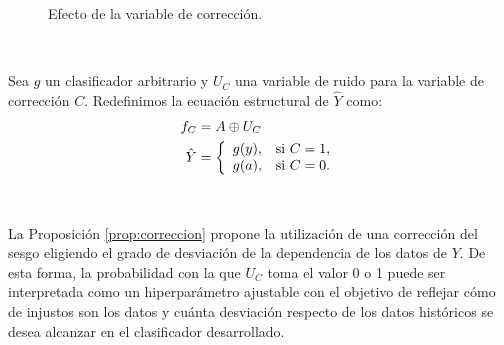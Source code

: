 \documentclass[oneside,openright,titlepage,numbers=noenddot,openany,headinclude,footinclude=true,
cleardoublepage=empty,abstractoff,BCOR=5mm,paper=a4,fontsize=12pt,main=spanish]{scrreprt}
\begin{document}
\begin{figure}[h]
\centering
{}
\caption{Efecto de la variable de corrección.}
\label{fig:effectcorrec}
\end{figure}\

\begin{proposition} 
Sea $g$ un clasificador arbitrario y $U_C$ una variable de ruido para la variable de corrección $C$. Redefinimos la ecuación estructural de $\hat{Y}$ como:
\begin{equation*}
\begin{split}
    f_C &= A \oplus U_C \\
    \hat{Y} &= \left \{
\begin{array}{l l}
g(y), & \mbox{si } C = 1, \\
g(a), & \mbox{si } C =0.
\end{array}
\right.
\end{split}
\end{equation*}
\label{prop:correccion}
\end{proposition}\

La Proposición \ref{prop:correccion} propone la utilización de una corrección del sesgo eligiendo el grado de desviación de la dependencia de los datos de $Y$. De esta forma, la probabilidad con la que $U_C$ toma el valor 0 o 1 puede ser interpretada como un hiperparámetro ajustable con el objetivo de reflejar cómo de injustos son los datos y cuánta desviación respecto de los datos históricos se desea alcanzar en el clasificador desarrollado.
\end{document}
